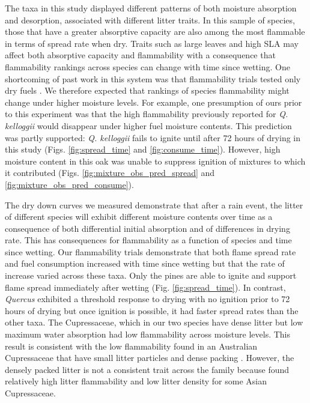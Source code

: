 \documentclass[letterpaper,12pt]{article}
\begin{document}
The taxa in this study displayed different patterns of both moisture absorption
and desorption, associated with different litter traits. In this sample of
species, those that have a greater absorptive capacity are also among the most
flammable in terms of spread rate when dry. Traits such as large leaves and
high SLA may affect both absorptive capacity and flammability with a
consequence that flammability rankings across species can change with time
since wetting. One shortcoming of past work in this system was that
flammability trials tested only dry fuels \citep{Magalhaes+Schwilk-2012}. We
therefore expected that rankings of species flammability might change under
higher moisture levels. For example, one presumption of ours prior to this
experiment was that the high flammability previously reported for \emph{Q.
  kelloggii} \citep{Magalhaes+Schwilk-2012} would disappear under higher fuel
moisture contents. This prediction was partly supported: \emph{Q. kelloggii}
fails to ignite until after 72 hours of drying in this study (Figs.
\ref{fig:spread_time} and \ref{fig:consume_time}). However, high moisture
content in this oak was unable to suppress ignition of mixtures to which it
contributed (Figs. \ref{fig:mixture_obs_pred_spread} and
\ref{fig:mixture_obs_pred_consume}).

The dry down curves we measured demonstrate that after a rain event, the litter
of different species will exhibit different moisture contents over time as a
consequence of both differential initial absorption and of differences in
drying rate. This has consequences for flammability as a function of species
and time since wetting. Our flammability trials demonstrate that both flame
spread rate and fuel consumption increased with time since wetting but that the
rate of increase varied across these taxa. Only the pines are able to ignite
and support flame spread immediately after wetting (Fig.
\ref{fig:spread_time}). In contrast, \emph{Quercus} exhibited a threshold
response to drying with no ignition prior to 72 hours of drying but once
ignition is possible, it had faster spread rates than the other taxa. The
Cupressaceae, which in our two species have dense litter but low maximum water
absorption had low flammability across moisture levels. This result is
consistent with the low flammability found in an Australian Cupressaceae that
have small litter particles and dense packing \citep{Scarff+Westoby-2006,
  Bowman+Haverkamp+etal-2018}. However, the densely packed litter is not a
consistent trait across the family because \citet{Cornwell+Elvira+etal-2015}
found relatively high litter flammability and low litter density for some Asian
Cupressaceae.
\end{document}
